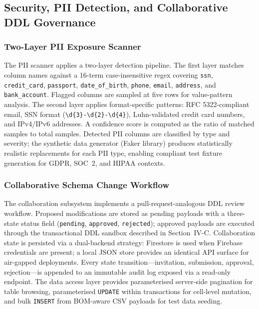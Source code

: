 \documentclass[conference]{IEEEtran}
\begin{document}
\subsection{Security, PII Detection, and Collaborative DDL Governance}

\subsubsection{Two-Layer PII Exposure Scanner}

The PII scanner applies a two-layer detection pipeline. The first layer
matches column names against a 16-term case-insensitive regex covering
\texttt{ssn}, \texttt{credit\_card}, \texttt{passport},
\texttt{date\_of\_birth}, \texttt{phone}, \texttt{email},
\texttt{address}, and \texttt{bank\_account}. Flagged columns are sampled
at five rows for value-pattern analysis. The second layer applies
format-specific patterns: RFC 5322-compliant email, SSN format
(\texttt{\textbackslash d\{3\}-\textbackslash d\{2\}-\textbackslash d\{4\}}),
Luhn-validated credit card numbers, and IPv4/IPv6 addresses. A confidence
score is computed as the ratio of matched samples to total samples.
Detected PII columns are classified by type and severity; the synthetic
data generator (Faker library) produces statistically realistic
replacements for each PII type, enabling compliant test fixture generation
for GDPR, SOC~2, and HIPAA contexts.

\subsubsection{Collaborative Schema Change Workflow}

The collaboration subsystem implements a pull-request-analogous DDL review
workflow. Proposed modifications are stored as pending payloads with a
three-state status field (\texttt{pending}, \texttt{approved},
\texttt{rejected}); approved payloads are executed through the transactional
DDL sandbox described in Section~IV-C. Collaboration state is persisted via
a dual-backend strategy: Firestore is used when Firebase credentials are
present; a local JSON store provides an identical API surface for air-gapped
deployments. Every state transition---invitation, submission, approval,
rejection---is appended to an immutable audit log exposed via a read-only
endpoint. The data access layer provides parameterised server-side
pagination for table browsing, parameterised \texttt{UPDATE} within
transactions for cell-level mutation, and bulk \texttt{INSERT} from
BOM-aware CSV payloads for test data seeding.
\end{document}
